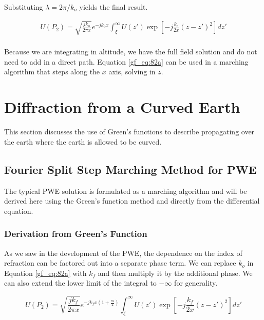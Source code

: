 \noindent Substituting $\lambda = 2\pi/k_o$ yields the final result.

\begin{equation}
\begin{aligned}
\boxed{U(P_2) =\sqrt{\frac{jk_o}{2\pi x}}e^{-jk_ox}\int_{\xi}^{\infty}U(z') \exp\left[-j \frac{k_o}{2x}\left(z-z'\right)^2 \right]dz'}\\
\end{aligned}
\label{gf_eq:82a}
\end{equation}
\renewcommand{\baselinestretch}{2} \small\normalsize

Because we are integrating in altitude, we have the full field solution and do not need to add in a direct path. Equation \ref{gf_eq:82a} can be used in a marching algorithm that steps along the $x$ axis, solving in $z$.

\section{Diffraction from a Curved Earth}
This section discusses the use of Green's functions to describe propagating over the earth where the earth is allowed to be curved.

\subsection{Fourier Split Step Marching Method for PWE}
The typical PWE solution is formulated as a marching algorithm and will be derived here using the Green's function method and directly from the differential equation. 

\subsubsection{Derivation from Green's Function}
As we saw in the development of the PWE, the dependence on the index of refraction can be factored out into a separate phase term. We can replace $k_o$ in Equation \ref{gf_eq:82a} with $k_f$ and then multiply it by the additional phase. We can also extend the lower limit of the integral to $-\infty$ for generality.

\begin{equation}
U(P_2) =\sqrt{\frac{jk_f}{2\pi x}}e^{-jk_fx\left(1+\frac{m}{2}\right)}\int_{\xi}^{\infty}U(z') \exp\left[-j \frac{k_f}{2x}\left(z-z'\right)^2 \right]dz'
\label{gf_eq:301}
\end{equation}
\renewcommand{\baselinestretch}{2} \small\normalsize

